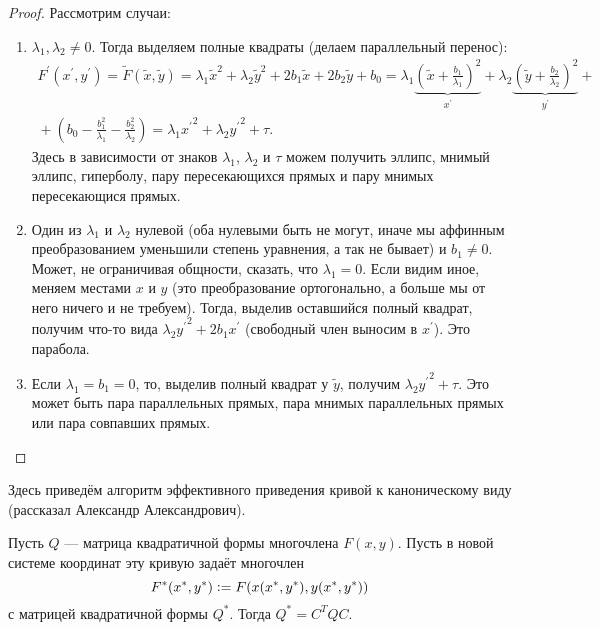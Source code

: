\begin{proof}
    Рассмотрим случаи:
    \begin{enumerate}
        \item $\lambda_1, \lambda_2 \ne 0$. Тогда выделяем полные квадраты (делаем параллельный перенос):
            $$
            \begin{array}{c}
                F^\prime(x^\prime, y^\prime) = \widetilde{F}(\widetilde{x}, \widetilde{y}) = \lambda_1 \widetilde{x}^2 + \lambda_2 \widetilde{y}^2 + 2b_1\widetilde{x} + 2b_2\widetilde{y} + b_0 = \lambda_1\underbrace{\left(\widetilde{x} + \frac{b_1}{\lambda_1}\right)^2}_{x^\prime} + \lambda_2\underbrace{\left(\widetilde{y} + \frac{b_2}{\lambda_2}\right)^2}_{y^\prime} + {}\\\displaystyle{} + \left(b_0 - \frac{b_1^2}{\lambda_1} - \frac{b_2^2}{\lambda_2}\right) = \lambda_1{x^\prime}^2 + \lambda_2{y^\prime}^2 + \tau.
            \end{array}
            $$
            Здесь в зависимости от знаков $\lambda_1$, $\lambda_2$ и $\tau$ можем получить эллипс, мнимый эллипс, гиперболу, пару пересекающихся прямых и пару мнимых пересекающися прямых.
        \item Один из $\lambda_1$ и $\lambda_2$ нулевой (оба нулевыми быть не могут, иначе мы аффинным преобразованием уменьшили степень уравнения, а так не бывает) и $b_1 \ne 0$. Может, не ограничивая общности, сказать, что $\lambda_1 = 0$. Если видим иное, меняем местами $x$ и $y$ (это преобразование ортогонально, а больше мы от него ничего и не требуем). Тогда, выделив оставшийся полный квадрат, получим что-то вида $\lambda_2{y^\prime}^2 + 2b_1 x^\prime$ (свободный член выносим в $x^\prime$). Это парабола.
        \item Если $\lambda_1 = b_1 = 0$, то, выделив полный квадрат у $\widetilde{y}$, получим $\lambda_2{y^\prime}^2 + \tau$. Это может быть пара параллельных прямых, пара мнимых параллельных прямых или пара совпавших прямых.
    \end{enumerate}
\end{proof}


Здесь приведём алгоритм эффективного приведения кривой к каноническому виду (рассказал Александр Александрович).

\begin{lemma}
    Пусть $Q$ --- матрица квадратичной формы многочлена $F(x, y)$. Пусть в новой системе координат эту кривую задаёт многочлен 
    $$F^\ast(x^\ast, y^\ast) \vcentcolon = F(x(x^\ast, y^\ast), y(x^\ast, y^\ast))$$
    с матрицей квадратичной формы $Q^\ast$. Тогда $Q^\ast = C^TQC$.
\end{lemma}

